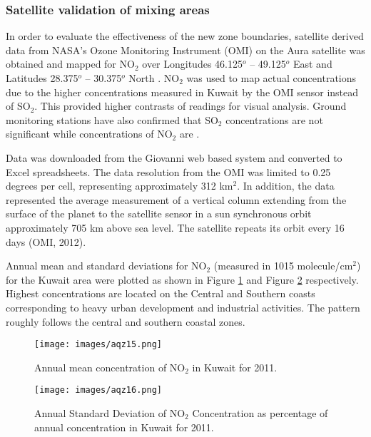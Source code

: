 \subsubsection{Satellite validation of mixing areas}

In order to evaluate the effectiveness of the new zone boundaries, satellite derived data from NASA’s Ozone Monitoring Instrument (OMI) on the Aura satellite was obtained and mapped for NO$_{2}$ over Longitudes 46.125$^{o}$ – 49.125$^{o}$ East and Latitudes 28.375$^{o}$ – 30.375$^{o}$ North \citep{Boersma2011, Strawa2013}.  NO$_{2}$ was used to map actual concentrations due to the higher concentrations measured in Kuwait by the OMI sensor instead of SO$_{2}$.  This provided higher contrasts of readings for visual analysis. Ground monitoring stations have also confirmed that SO$_{2}$ concentrations are not significant while concentrations of NO$_{2}$ are \citep{Al-Awadhi2014}.

Data was downloaded from the Giovanni web based system \citep{Acker2007} and converted to Excel spreadsheets.  The data resolution from the OMI was limited to 0.25 degrees per cell, representing approximately 312 km$^{2}$.  In addition, the data represented the average measurement of a vertical column extending from the surface of the planet to the satellite sensor in a sun synchronous orbit approximately 705 km above sea level.  The satellite repeats its orbit every 16 days (OMI, 2012). 

Annual mean and standard deviations for NO$_{2}$ (measured in 1015 molecule/cm$^{2}$) for the Kuwait area were plotted as shown in Figure \ref{fig:15meanNO2} and Figure \ref{fig:16stdNO2} respectively.  Highest concentrations are located on the Central and Southern coasts corresponding to heavy urban development and industrial activities. The pattern roughly follows the central and southern coastal zones.

%
\begin{figure}[!htb]
\texttt{[image: images/aqz15.png]} 
\caption{Annual mean concentration of NO$_{2}$ in Kuwait for 2011.}
\label{fig:15meanNO2}
\end{figure}
%
%
\begin{figure}[!htb]
\texttt{[image: images/aqz16.png]} 
\caption[Annual Standard Deviation of NO$_{2}$ Concentration]{Annual Standard Deviation of NO$_{2}$ Concentration as percentage of annual concentration in Kuwait for 2011.}
\label{fig:16stdNO2}
\end{figure}
%

